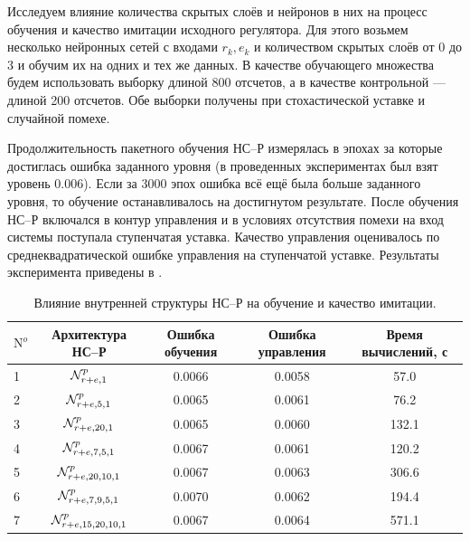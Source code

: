 
Исследуем влияние количества скрытых слоёв и нейронов в них на
процесс обучения и качество имитации исходного регулятора.  Для этого
возьмем несколько нейронных сетей с входами $r_k,e_k$ и количеством
скрытых слоёв от 0 до 3 и обучим их на одних и тех же данных.  В
качестве обучающего множества будем использовать выборку длиной 800
отсчетов, а в качестве контрольной --- длиной 200 отсчетов.  Обе
выборки получены при стохастической уставке и случайной помехе.

Продолжительность пакетного обучения НС--Р измерялась в эпохах за
которые достиглась ошибка заданного уровня (в проведенных
экспериментах был взят уровень 0.006).  Если за 3000 эпох ошибка всё
ещё была больше заданного уровня, то обучение останавливалось на
достигнутом результате.  После обучения НС--Р включался в контур
управления и в условиях отсутствия помехи на вход системы поступала
ступенчатая уставка.  Качество управления оценивалось по
среднеквадратической ошибке управления на ступенчатой уставке.
Результаты эксперимента приведены в .

\begin{table}
\caption{Влияние внутренней структуры НС--Р на обучение и качество имитации.}\label{tabl:nnc_internal_arch}
\begin{tabular}{|l|c|c|c|c|}
\hline
$\mathrm{N}^o$ & Архитектура НС--Р & Ошибка обучения & Ошибка управления & Время вычислений, с\\
\hline
1 & $\mathcal{N}^p_{r+e,1}$          & 0.0066& 0.0058 & 57.0\\
2 & $\mathcal{N}^p_{r+e,5,1}$        & 0.0065& 0.0061 & 76.2\\
3 & $\mathcal{N}^p_{r+e,20,1}$       & 0.0065& 0.0060 & 132.1\\
4 & $\mathcal{N}^p_{r+e,7,5,1}$      & 0.0067& 0.0061 & 120.2\\
5 & $\mathcal{N}^p_{r+e,20,10,1}$    & 0.0067& 0.0063 & 306.6\\
6 & $\mathcal{N}^p_{r+e,7,9,5,1}$    & 0.0070& 0.0062 & 194.4\\
7 & $\mathcal{N}^p_{r+e,15,20,10,1}$ & 0.0067& 0.0064 & 571.1\\
\hline
\end{tabular}
\end{table}

